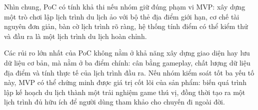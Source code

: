 Nhìn chung, PoC có tính khả thi nếu nhóm giữ đúng phạm vi MVP: xây dựng một trò chơi lập lịch trình du lịch ảo với bộ thẻ địa điểm giới hạn, cơ chế tài nguyên đơn giản, bàn cờ lịch trình rõ ràng, hệ thống tính điểm có thể kiểm thử và đầu ra là một lịch trình du lịch hoàn chỉnh.

Các rủi ro lớn nhất của PoC không nằm ở khả năng xây dựng giao diện hay lưu dữ liệu cơ bản, mà nằm ở ba điểm chính: cân bằng gameplay, chất lượng dữ liệu địa điểm và tính thực tế của lịch trình đầu ra. Nếu nhóm kiểm soát tốt ba yếu tố này, MVP có thể chứng minh được giá trị cốt lõi của sản phẩm: biến quá trình lập kế hoạch du lịch thành một trải nghiệm game thú vị, đồng thời tạo ra một lịch trình đủ hữu ích để người dùng tham khảo cho chuyến đi ngoài đời.
